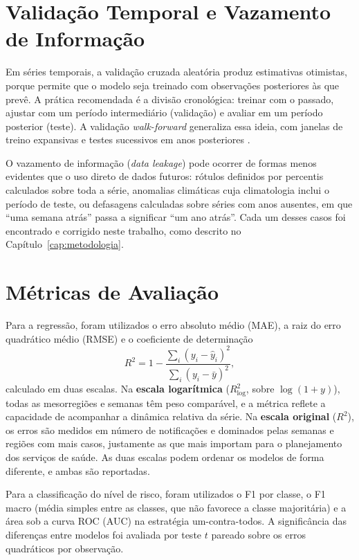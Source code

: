 \section{Validação Temporal e Vazamento de Informação}

Em séries temporais, a validação cruzada aleatória produz estimativas otimistas, porque permite que o modelo seja treinado com observações posteriores às que prevê. A prática recomendada é a divisão cronológica: treinar com o passado, ajustar com um período intermediário (validação) e avaliar em um período posterior (teste). A validação \textit{walk-forward} generaliza essa ideia, com janelas de treino expansivas e testes sucessivos em anos posteriores \cite{hyndman2018forecasting}.

O vazamento de informação (\textit{data leakage}) pode ocorrer de formas menos evidentes que o uso direto de dados futuros: rótulos definidos por percentis calculados sobre toda a série, anomalias climáticas cuja climatologia inclui o período de teste, ou defasagens calculadas sobre séries com anos ausentes, em que ``uma semana atrás'' passa a significar ``um ano atrás''. Cada um desses casos foi encontrado e corrigido neste trabalho, como descrito no Capítulo~\ref{cap:metodologia}.

\section{Métricas de Avaliação}

Para a regressão, foram utilizados o erro absoluto médio (MAE), a raiz do erro quadrático médio (RMSE) e o coeficiente de determinação
\begin{equation}
R^2 = 1 - \frac{\sum_i (y_i - \hat{y}_i)^2}{\sum_i (y_i - \bar{y})^2},
\end{equation}
calculado em duas escalas. Na \textbf{escala logarítmica} ($R^2_{\log}$, sobre $\log(1+y)$), todas as mesorregiões e semanas têm peso comparável, e a métrica reflete a capacidade de acompanhar a dinâmica relativa da série. Na \textbf{escala original} ($R^2$), os erros são medidos em número de notificações e dominados pelas semanas e regiões com mais casos, justamente as que mais importam para o planejamento dos serviços de saúde. As duas escalas podem ordenar os modelos de forma diferente, e ambas são reportadas.

Para a classificação do nível de risco, foram utilizados o F1 por classe, o F1 macro (média simples entre as classes, que não favorece a classe majoritária) e a área sob a curva ROC (AUC) na estratégia um-contra-todos. A significância das diferenças entre modelos foi avaliada por teste $t$ pareado sobre os erros quadráticos por observação.

